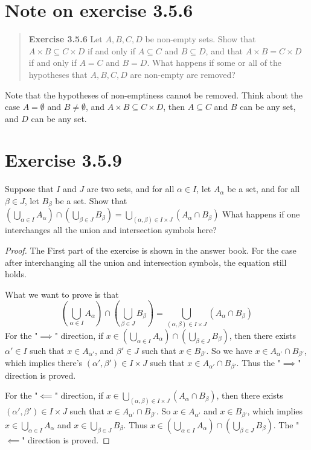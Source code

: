 \documentclass{article}
\begin{document}
\section{Note on exercise 3.5.6}
\begin{quotation}
    \textbf{Exercise 3.5.6}
    Let $A, B, C, D$ be non-empty sets. Show that $A \times B \subseteq C \times D$ if and only if $A \subseteq C$ and $B \subseteq D$, and that $A \times B = C \times D$ if and only if $A = C$ and $B = D$.
    What happens if some or all of the hypotheses that $A, B, C, D$ are non-empty are removed?
\end{quotation}
Note that the hypotheses of non-emptiness cannot be removed. Think about the case
$A=\emptyset $ and $B\ne \emptyset $, and $A\times B\subseteq C\times D$,
then $A\subseteq C$ and $B$ can be any set, and $D$ can be any set.

\section{Exercise 3.5.9}
Suppose that $I$ and $J$ are two sets, and for all $\alpha \in I$, let $A_\alpha$ be a set,
and for all $\beta \in J$, let $B_\beta$ be a set. Show that
$\left( \bigcup_{\alpha \in I} A_\alpha \right)
    \cap \left( \bigcup_{\beta \in J} B_\beta \right)
    = \bigcup_{(\alpha, \beta) \in I \times J} (A_\alpha \cap B_\beta)$
What happens if one interchanges all the union and intersection symbols here?

\begin{proof}
    The First part of the exercise is shown in the answer book.
    For the case after interchanging all the union and intersection symbols,
    the equation still holds.

    What we want to prove is that
    \[
        (\bigcup_{\alpha \in I} A_{\alpha})
        \cap (\bigcup_{\beta \in J} B_{\beta})
        = \bigcup_{(\alpha,\beta) \in I \times J} (A_{\alpha} \cap B_{\beta})
    \]
    For the "$\implies$" direction,
    if $x\in (\bigcup_{\alpha \in I} A_{\alpha})\cap (\bigcup_{\beta \in J} B_{\beta})$,
    then there exists $\alpha'\in I$ such that $x\in A_{\alpha'}$,
    and $\beta'\in J$ such that $x\in B_{\beta'}$.
    So we have $x\in A_{\alpha'}\cap B_{\beta'}$, which implies
    there's $(\alpha',\beta')\in I\times J$ such that $x\in A_{\alpha'}\cap B_{\beta'}$.
    Thus the "$\implies$" direction is proved.

    For the "$\impliedby$" direction, if $x\in \bigcup_{(\alpha,\beta) \in I \times J} (A_{\alpha} \cap B_{\beta})$,
    then there exists $(\alpha',\beta')\in I\times J$ such that $x\in A_{\alpha'}\cap B_{\beta'}$.
    So $x\in A_{\alpha'}$ and $x\in B_{\beta'}$,
    which implies $x\in\bigcup_{\alpha \in I} A_{\alpha}$ and $x\in\bigcup_{\beta \in J} B_{\beta}$.
    Thus $x\in (\bigcup_{\alpha \in I} A_{\alpha})\cap (\bigcup_{\beta \in J} B_{\beta})$.
    The "$\impliedby$" direction is proved.
\end{proof}
\end{document}
